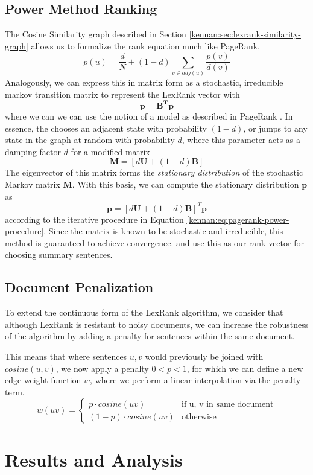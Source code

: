 \documentclass[../writeup.tex]{subfiles}
\begin{document}
\subsection{Power Method Ranking}\label{kennan:sec:power-method}
The Cosine Similarity graph described in Section \ref{kennan:sec:lexrank-similarity-graph} allows us to formalize
the rank equation much like PageRank,
\begin{equation}\label{kennan:eq:lexrank-equation}
    p(u) = \frac{d}{N} + (1 - d) \sum_{v \in adj(u)} \frac{p(v)}{d(v)}
\end{equation}
Analogously, we can express this in matrix form as a stochastic, irreducible markov transition
matrix to represent the LexRank vector with
\begin{equation}
    \mathbf{p} = \mathbf{B^Tp}
\end{equation}
where we can we can use the notion of a  model as described in PageRank \autocite*[]{pagerank}.
In essence, the  chooses an adjacent state with probability $(1 - d)$, or jumps to any state
in the graph at random with probability $d$, where this parameter acts as a damping factor $d$ for a modified matrix
\begin{equation}
    \mathbf{M} = [d\mathbf{U} + (1-d)\mathbf{B}]
\end{equation}
The eigenvector of this matrix forms the \textit{stationary distribution} of the stochastic Markov matrix $\mathbf{M}$.
With this basis, we can compute the stationary distribution $\mathbf{p}$ as
\begin{equation}\label{kennan:eq:power-method}
    \mathbf{p} = [d\mathbf{U} + (1-d)\mathbf{B}]^T\mathbf{p}
\end{equation}
according to the iterative procedure in Equation \ref{kennan:eq:pagerank-power-procedure}. Since the matrix is known
to be stochastic and irreducible, this method is guaranteed to achieve convergence.
and use this as our rank vector for choosing summary sentences.

\subsection{Document Penalization}\label{kennan:sec:document-penalty}
To extend the continuous form of the LexRank algorithm, we consider that although
LexRank is resistant to noisy documents, we can increase the
robustness of the algorithm by adding a penalty for sentences within the same document.

This means that where sentences $u, v$ would previously be joined with $cosine(u,v)$, we now
apply a penalty $0 < p < 1$, for which we can define a new edge weight function $w$, where we perform a linear
interpolation via the penalty term.
\begin{equation}\label{kennan:eq:document-penalty}
    w(uv) = \begin{cases}
        p \cdot cosine(uv) & \text{if u, v in same document} \\
        (1 - p) \cdot cosine(uv) & \text{otherwise}
    \end{cases}
\end{equation}

\section{Results and Analysis}
\end{document}
